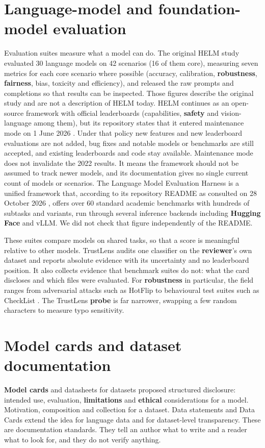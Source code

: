 \section{Language-model and foundation-model evaluation}
Evaluation suites measure what a model can do. The original HELM study \cite{liang2023helm} evaluated 30 language models on 42 scenarios (16 of them core), measuring seven metrics for each core scenario where possible (accuracy, calibration, \textbf{robustness}, \textbf{fairness}, bias, toxicity and efficiency), and released the raw prompts and completions so that results can be inspected. Those figures describe the original study and are not a description of HELM today. HELM continues as an open-source framework with official leaderboards (capabilities, \textbf{safety} and vision-language among them), but its repository states that it entered maintenance mode on 1 June 2026 \cite{helmrepo,helmmaint}. Under that policy new features and new leaderboard evaluations are not added, bug fixes and notable models or benchmarks are still accepted, and existing leaderboards and code stay available. Maintenance mode does not invalidate the 2022 results. It means the framework should not be assumed to track newer models, and its documentation gives no single current count of models or scenarios. The Language Model Evaluation Harness \cite{gao2024harness} is a unified framework that, according to its repository README as consulted on 28 October 2026 \cite{harnessrepo}, offers over 60 standard academic benchmarks with hundreds of subtasks and variants, run through several inference backends including \textbf{Hugging Face}  and vLLM. We did not check that figure independently of the README.

These suites compare models on shared tasks, so that a score is meaningful relative to other models. TrustLens audits one classifier on the \textbf{reviewer}'s own dataset and reports absolute evidence with its uncertainty and no leaderboard position. It also collects evidence that benchmark suites do not: what the card discloses and which files were evaluated. For \textbf{robustness} in particular, the field ranges from adversarial attacks such as HotFlip \cite{ebrahimi2018} to behavioural test suites such as CheckList \cite{ribeiro2020}. The TrustLens \textbf{probe} is far narrower, swapping a few random characters to measure typo sensitivity.

\section{Model cards and dataset documentation}
\textbf{Model cards} \cite{mitchell2019} and datasheets for datasets \cite{gebru2021} proposed structured disclosure: intended use, evaluation, \textbf{limitations} and \textbf{ethical} considerations for a model. Motivation, composition and collection for a dataset. Data statements \cite{bender2018} and Data Cards \cite{pushkarna2022} extend the idea for language data and for dataset-level transparency. These are documentation standards. They tell an author what to write and a reader what to look for, and they do not verify anything.

